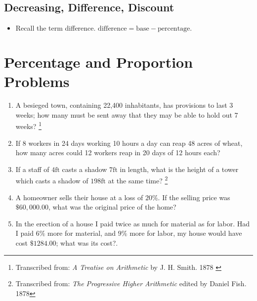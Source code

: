 \documentclass{article}
\begin{document}
\subsection*{Decreasing, Difference, Discount}
\begin{itemize}
\item Recall the term difference.  $\mathrm{difference} = \mathrm{base} - \mathrm{percentage}$.
\end{itemize}

\section*{Percentage and Proportion Problems}
\begin{enumerate}
  \item A besieged town, containing 22,400 inhabitants, has provisions to last 3 weeks; how many must be sent away that they may be able to hold out 7 weeks? \footnote{Transcribed from: {\em A Treatise on Arithmetic} by J. H. Smith. 1878 \label{fn:treatise}}
  \item  If 8 workers in 24 days working 10 hours a day can reap 48 acres of wheat, how many acres could 12 workers reap in 20 days of 12 hours each?
  \item If a staff of $4\mathrm{ft}$ casts a shadow $7\mathrm{ft}$ in length, what is the height of a tower which casts a shadow of $198\mathrm{ft}$ at the same time? \footnote{Transcribed from: {\em The Progressive Higher Arithmetic} edited by Daniel Fish. 1878\label{fn:higher}}
  \item A homeowner sells their house at a loss of $20\%$.  If the selling price was 
  $\$60,000.00$, what was the original price of the home?
  \item In the erection of a house I paid twice as much for material as for labor.  Had I paid $6\%$ more for material, and $9\%$ more for labor, my house would have cost $\$1284.00$; what was its cost?\footnotemark[\ref{fn:higher}].
\end{enumerate}
\end{document}
